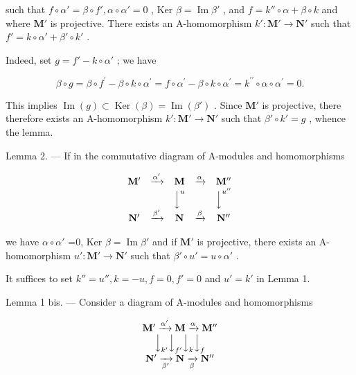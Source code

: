 such that \(f \circ \alpha' = \beta \circ f', \alpha \circ \alpha' = 0\) , Ker \(\beta = \operatorname{Im} \beta'\) , and \(f = k'' \circ \alpha + \beta \circ k\) and where \(\mathbf{M}'\) is projective. There exists an A-homomorphism \(k': \mathbf{M}' \to \mathbf{N}'\) such that \(f' = k \circ \alpha' + \beta' \circ k'\) .

Indeed, set \(g = f' - k \circ \alpha'\) ; we have

\[
\beta \circ g = \beta \circ f ^ {\prime} - \beta \circ k \circ \alpha^ {\prime} = f \circ \alpha^ {\prime} - \beta \circ k \circ \alpha^ {\prime} = k ^ {\prime \prime} \circ \alpha \circ \alpha^ {\prime} = 0.
\]

This implies \(\operatorname{Im}(g) \subset \operatorname{Ker}(\beta) = \operatorname{Im}(\beta')\) . Since \(\mathbf{M}'\) is projective, there therefore exists an A-homomorphism \(k': \mathbf{M}' \to \mathbf{N}'\) such that \(\beta' \circ k' = g\) , whence the lemma.

Lemma 2. --- If in the commutative diagram of A-modules and homomorphisms

\[
\begin{array}{c c c c c} \mathbf {M} ^ {\prime} & \xrightarrow {\alpha^ {\prime}} & \mathbf {M} & \xrightarrow {\alpha} & \mathbf {M} ^ {\prime \prime} \\ & & \Big \downarrow^ {u} & & \Big \downarrow^ {u ^ {\prime \prime}} \\ \mathbf {N} ^ {\prime} & \xrightarrow {\beta^ {\prime}} & \mathbf {N} & \xrightarrow {\beta} & \mathbf {N} ^ {\prime \prime} \end{array}
\]

we have \(\alpha\circ\alpha'\) =0, Ker \(\beta=\operatorname{Im}\beta'\) and if \(\mathbf{M}'\) is projective, there exists an A-homomorphism \(u':\mathbf{M}'\to\mathbf{N}'\) such that \(\beta'\circ u'=u\circ\alpha'\) .

It suffices to set \(k'' = u'', k = -u, f = 0, f' = 0\) and \(u' = k'\) in Lemma 1.

Lemma 1 bis. --- Consider a diagram of A-modules and homomorphisms

\[
\begin{array}{c} \mathbf {M} ^ {\prime} \xrightarrow {\alpha^ {\prime}} \mathbf {M} \xrightarrow {\alpha} \mathbf {M} ^ {\prime \prime} \\ \Big \downarrow_ {k ^ {\prime}} \Big \downarrow_ {f ^ {\prime}} \Big \downarrow_ {k} \Big \downarrow_ {f} \\ \mathbf {N} ^ {\prime} \xrightarrow [ \beta^ {\prime} ]{} \mathbf {N} \xrightarrow [ \beta ]{} \mathbf {N} ^ {\prime \prime} \end{array}
\]

